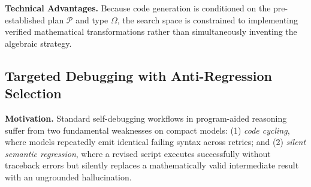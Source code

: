 \documentclass[conference,a4paper]{IEEEtran}
\begin{document}
\textbf{Technical Advantages.} Because code generation is conditioned on the pre-established plan $\mathcal{P}$ and type $\Omega$, the search space is constrained to implementing verified mathematical transformations rather than simultaneously inventing the algebraic strategy.

\subsection{Targeted Debugging with Anti-Regression Selection}
\label{sec:debugging}

\textbf{Motivation.} Standard self-debugging workflows in program-aided reasoning suffer from two fundamental weaknesses on compact models: (1) \textit{code cycling}, where models repeatedly emit identical failing syntax across retries; and (2) \textit{silent semantic regression}, where a revised script executes successfully without traceback errors but silently replaces a mathematically valid intermediate result with an ungrounded hallucination.
\end{document}
